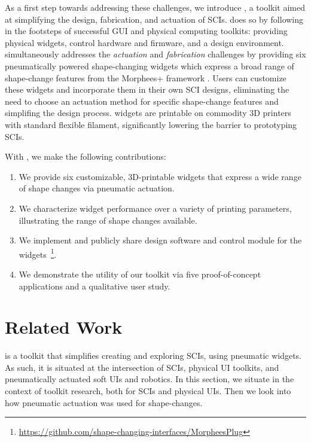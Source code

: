     As a first step towards addressing these challenges, we introduce \mp, a
    toolkit aimed at simplifying the design, fabrication, and actuation of
    SCIs. \mp does so by following in the footsteps of successful GUI
    and physical computing toolkits: providing physical widgets, control
    hardware and firmware, and a design environment. \mp simultaneously
    addresses the \textit{actuation} and \textit{fabrication} challenges by
    providing six pneumatically powered shape-changing widgets which express a
    broad range of shape-change features from the Morphees+ framework
    \cite{10.1145/3173574.3174193}. Users can customize these widgets and
    incorporate them in their own SCI designs, eliminating the need to choose
    an actuation method for specific shape-change features and simplifing the
    design process. \mp widgets are printable on commodity 3D printers with
    standard flexible filament, significantly lowering the barrier to
    prototyping SCIs. 

    With \mp, we make the following contributions:     
      \begin{enumerate}
        \item We provide six customizable, 3D-printable widgets that express
          a wide range of shape changes via pneumatic actuation.
        \item We characterize widget performance over a variety of printing
          parameters, illustrating the range of shape changes available.
        \item We implement and publicly share design software and control
          module for the
          widgets~\footnote{\url{https://github.com/shape-changing-interfaces/MorpheesPlug}}.
        \item We demonstrate the utility of our toolkit via five
          proof-of-concept applications and a qualitative user study.
      \end{enumerate}

  \section{Related Work}
    \mp is a toolkit that simplifies creating and exploring SCIs, using
    pneumatic widgets. As such, it is situated at the intersection of
    SCIs, physical UI toolkits, and pneumatically actuated soft UIs and
    robotics. In this section, we situate \mp in the context of toolkit
    research, both for SCIs and physical UIs. Then we look into how
    pneumatic actuation was used for shape-changes.
    
